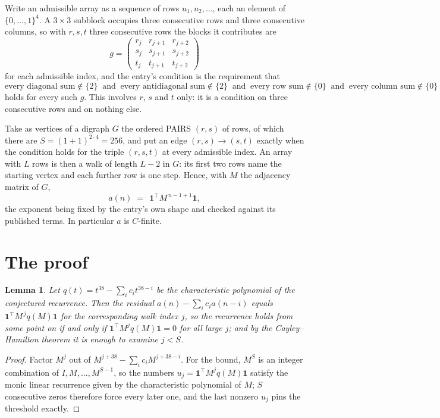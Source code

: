 \documentclass[11pt,a4paper]{article}
\theoremstyle{plain}
\newtheorem{lemma}[theorem]{Lemma}
\theoremstyle{definition}
\begin{document}
Write an admissible array as a sequence of rows $u_1,u_2,\dots$, each an element of
$\{0,\dots,1\}^{4}$. A $3\times3$ subblock occupies three consecutive rows and
three consecutive columns, so with $r,s,t$ three consecutive rows the blocks it
contributes are
\[
g=\begin{pmatrix}r_j&r_{j+1}&r_{j+2}\\ s_j&s_{j+1}&s_{j+2}\\ t_j&t_{j+1}&t_{j+2}\end{pmatrix}
\]
for each admissible index, and the entry's condition is the requirement that
\[
\text{every diagonal sum} \notin \{2\}\ \text{ and }\ \text{every antidiagonal sum} \notin \{2\}\ \text{ and }\ \text{every row sum} \notin \{0\}\ \text{ and }\ \text{every column sum} \notin \{0\}
\]
holds for every such $g$. This involves $r$, $s$ and $t$ only: it is a condition on
three consecutive rows and on nothing else.

Take as vertices of a digraph $G$ the ordered PAIRS $(r,s)$ of rows, of which there are
$S=(1+1)^{2\cdot4}=256$, and put an edge $(r,s)\to(s,t)$ exactly when the condition
holds for the triple $(r,s,t)$ at every admissible index. An array with $L$ rows is then a
walk of length $L-2$ in $G$: its first two rows name the starting vertex and each further
row is one step. Hence, with $M$ the adjacency matrix of $G$,
\[
a(n)\;=\;\,\mathbf{1}^{\!\top}M^{\,n-1+1}\mathbf{1},
\]
the exponent being fixed by the entry's own shape and checked against its published terms.
In particular $a$ is $C$-finite.

\section{The proof}

\begin{lemma}\label{lem:crit}
Let $q(t)=t^{38}-\sum_i c_it^{38-i}$ be the characteristic polynomial of the
conjectured recurrence. Then the residual $a(n)-\sum_ic_ia(n-i)$ equals
$\mathbf{1}^{\!\top}M^{\,j}q(M)\mathbf{1}$ for the corresponding walk index
$j$, so the recurrence holds from some point on if and only if
$\mathbf{1}^{\!\top}M^{j}q(M)\mathbf{1}=0$ for all large $j$; and by the
Cayley--Hamilton theorem it is enough to examine $j<S$.
\end{lemma}

\begin{proof}
Factor $M^{j}$ out of $M^{j+38}-\sum_ic_iM^{j+38-i}$. For the bound, $M^{S}$
is an integer combination of $I,M,\dots,M^{S-1}$, so the numbers
$u_j=\mathbf{1}^{\!\top}M^{j}q(M)\mathbf{1}$ satisfy the monic linear recurrence given by
the characteristic polynomial of $M$; $S$ consecutive zeros therefore force every later one,
and the last nonzero $u_j$ pins the threshold exactly.
\end{proof}
\end{document}
